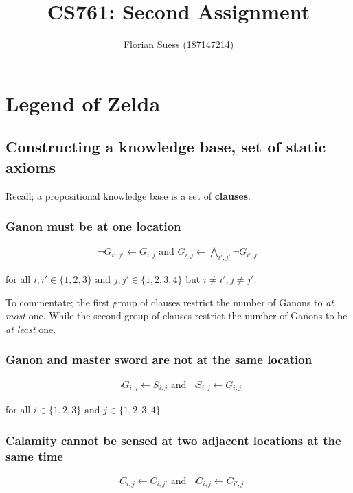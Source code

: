 \documentclass{article}
\begin{document}
\title{CS761: Second Assignment}
\date{}
\author{Florian Suess (187147214)}
\maketitle

\section*{Legend of Zelda}
\subsection{Constructing a knowledge base, set of static axioms}
Recall; a propositional knowledge base is a set of \textbf{clauses}.
\subsubsection*{Ganon must be at one location}
\begin{align*}
	\neg G_{i',j'} \leftarrow G_{i,j} \text { and } G_{i,j} \leftarrow \bigwedge_{i',j'} \neg G_{i',j'}
\end{align*}

\begin{flushright}
for all $i,i' \in \{1,2,3\} \text{ and } j,j' \in \{1,2,3,4\} \text{ but } i \not= i',j\not=j'$.
\end{flushright}


To commentate; the first group of clauses restrict the number of Ganons to \emph{at most} one. While the second group of clauses restrict the number of Ganons to be \emph{at least} one.

\subsubsection*{Ganon and master sword are not at the same location}
\begin{align*}
	\neg G_{i,j} \leftarrow S_{i,j}  \text{ and } \neg S_{i,j} \leftarrow G_{i,j}
\end{align*}
\begin{flushright}
for all $i \in \{1,2,3\} \text{ and } j \in \{1,2,3,4\}$
\end{flushright}

\subsubsection*{Calamity cannot be sensed at two adjacent locations at the same time}
\begin{align*}
	\neg C_{i,j} \leftarrow C_{i,j'} \text{ and } \neg C_{i,j} \leftarrow C_{i',j}
\end{align*}
\end{document}

